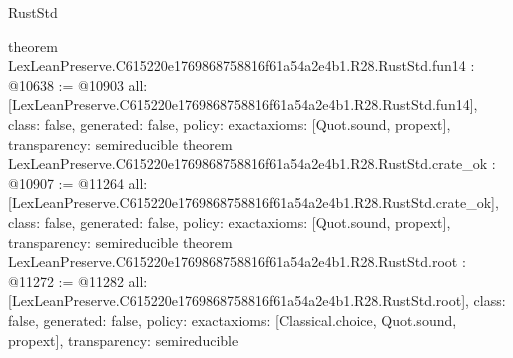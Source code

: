 \begin{lexlean}{RustStd}
\begin{coremodule}
{}
theorem LexLeanPreserve.C615220e1769868758816f61a54a2e4b1.R28.RustStd.fun14 : @10638 := @10903 {
  all: [LexLeanPreserve.C615220e1769868758816f61a54a2e4b1.R28.RustStd.fun14],
  class: false,
  generated: false,
  policy: exact{axioms: [Quot.sound, propext]},
  transparency: semireducible
}
theorem LexLeanPreserve.C615220e1769868758816f61a54a2e4b1.R28.RustStd.crate_ok : @10907 := @11264 {
  all: [LexLeanPreserve.C615220e1769868758816f61a54a2e4b1.R28.RustStd.crate_ok],
  class: false,
  generated: false,
  policy: exact{axioms: [Quot.sound, propext]},
  transparency: semireducible
}
theorem LexLeanPreserve.C615220e1769868758816f61a54a2e4b1.R28.RustStd.root : @11272 := @11282 {
  all: [LexLeanPreserve.C615220e1769868758816f61a54a2e4b1.R28.RustStd.root],
  class: false,
  generated: false,
  policy: exact{axioms: [Classical.choice, Quot.sound, propext]},
  transparency: semireducible
}


\end{coremodule}
\end{lexlean}
